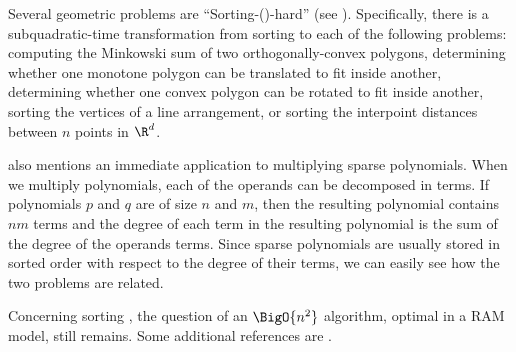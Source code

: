 Several geometric problems are ``Sorting-(\XY)-hard'' (see
\citet*{barrera1996finding,barequet2001polygon}). Specifically, there
is a subquadratic-time transformation from sorting \XY to each of the
following problems: computing the Minkowski sum of two orthogonally-convex
polygons, determining whether one monotone polygon can be translated to fit
inside another, determining whether one convex polygon can be rotated to fit
inside another, sorting the vertices of a line arrangement, or sorting the
interpoint distances between $n$ points in $\R^d$.

\citet*{fredman:1976} also mentions an immediate application to multiplying
sparse polynomials. When we multiply polynomials, each of the
operands can be decomposed in terms. If polynomials $p$ and $q$ are of size $n$
and $m$, then the resulting polynomial contains $nm$ terms and the degree of
each term in the resulting polynomial is the sum of the degree of the operands
terms. Since sparse polynomials are usually stored in sorted order with respect
to the degree of their terms, we can easily see how the two problems are
related.

Concerning sorting \XY, the question of an \(\BigO{n^2}\) algorithm, optimal
in a RAM model, still
remains. Some additional references are \citet*{
harper:1975,
kahn:1995,
dietzfelbinger1989lower,
steiger1995pseudo,
lambert:1990,
erickson:1999,
bremner2012necklaces,
orourke:2012:sortxy}.
